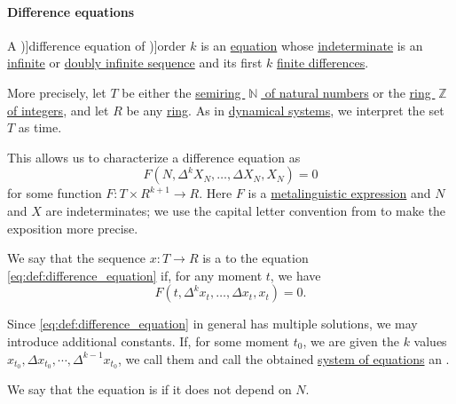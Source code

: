 \paragraph{Difference equations}

\begin{definition}\label{def:difference_equation}\mimprovised
  A \term[ru=разностное уравнение (\cite[307]{Гельфонд1959ИсчислениеКонечныхРазностей})]{difference equation} of \term[ru=порядок (разностного уравнения) (\cite[307]{Гельфонд1959ИсчислениеКонечныхРазностей})]{order} \( k \) is an \hyperref[def:equation]{equation} whose \hyperref[con:indeterminate]{indeterminate} is an \hyperref[def:sequence]{infinite} or \hyperref[def:doubly_infinite_sequence]{doubly infinite sequence} and its first \( k \) \hyperref[def:finite_difference_operator]{finite differences}.

  More precisely, let \( T \) be either the \hyperref[def:natural_numbers]{semiring \( \BbbN \) of natural numbers} or the \hyperref[def:integers]{ring \( \BbbZ \) of integers}, and let \( R \) be any \hyperref[def:ring]{ring}. As in \hyperref[def:dynamical_system]{dynamical systems}, we interpret the set \( T \) as time.

  This allows us to characterize a difference equation as
  \begin{equation}\label{eq:def:difference_equation}
    F(N, \Delta^k X_N, \ldots, \Delta X_N, X_N) = 0
  \end{equation}
  for some function \( F: T \times R^{k+1} \to R \). Here \( F \) is a \hyperref[con:expression]{metalinguistic expression} and \( N \) and \( X \) are indeterminates; we use the capital letter convention from  to make the exposition more precise.

  \begin{thmenum}
     We say that the sequence \( x: T \to R \) is a  to the equation \eqref{eq:def:difference_equation} if, for any moment \( t \), we have
    \begin{equation*}
      F(t, \Delta^k x_t, \ldots, \Delta x_t, x_t) = 0.
    \end{equation*}

     Since \eqref{eq:def:difference_equation} in general has multiple solutions, we may introduce additional constants. If, for some moment \( t_0 \), we are given the \( k \) values \( x_{t_0}, \Delta x_{t_0}, \cdots, \Delta^{k-1} x_{t_0} \), we call them  and call the obtained \hyperref[def:equation/system]{system of equations} an .

     We say that the equation is  if it does not depend on \( N \).
  \end{thmenum}
\end{definition}
